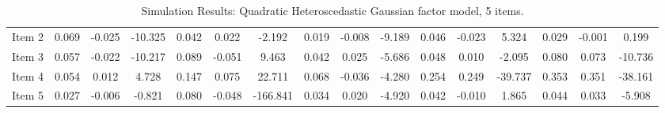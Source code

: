 \documentclass[11pt, a4paper]{article}
\begin{document}
\begin{table}[h!]
{{\begin{tabular}{lccccccccccccccc}
Item 2 & 0.069 & -0.025 & -10.325 & 0.042 & 0.022 & -2.192 & 0.019 & -0.008 & -9.189 & 0.046 & -0.023 & 5.324 & 0.029 & -0.001 & 0.199 \\ 
Item 3 & 0.057 & -0.022 & -10.217 & 0.089 & -0.051 & 9.463 & 0.042 & 0.025 & -5.686 & 0.048 & 0.010 & -2.095 & 0.080 & 0.073 & -10.736 \\ 
Item 4 & 0.054 & 0.012 & 4.728 & 0.147 & 0.075 & 22.711 & 0.068 & -0.036 & -4.280 & 0.254 & 0.249 & -39.737 & 0.353 & 0.351 & -38.161 \\ 
Item 5 & 0.027 & -0.006 & -0.821 & 0.080 & -0.048 & -166.841 & 0.034 & 0.020 & -4.920 & 0.042 & -0.010 & 1.865 & 0.044 & 0.033 & -5.908 \\ 
\cmidrule(lr){2-16}
\end{tabular}%
} %
} %
\caption{Simulation Results: Quadratic Heteroscedastic Gaussian factor model, 5 items.}
\label{tab:A1Sim1a}
\end{table}

\clearpage

\end{document}
